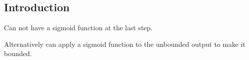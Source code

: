 
\subsection{Introduction}

Can not have a sigmoid function at the last step.

Alternatively can apply a sigmoid function to the unbounded output to make it bounded.